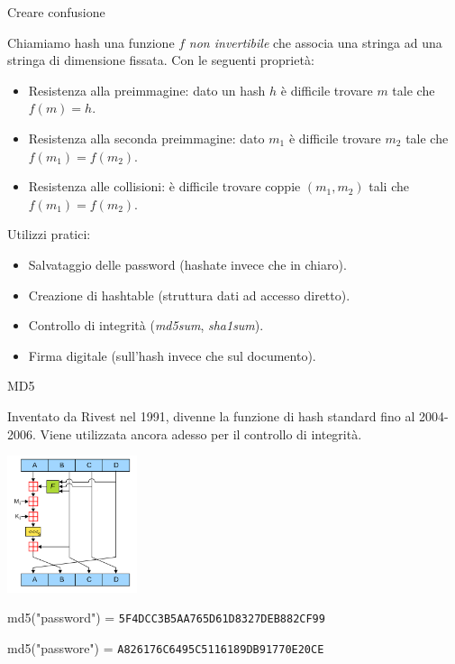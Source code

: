 \documentclass[xcolor=dvipsnames,aspectratio=169]{beamer}
\begin{document}
\begin{frame}{Creare confusione}

\pause

Chiamiamo hash una funzione $f$ \textit{non invertibile} che associa una stringa ad una stringa di dimensione fissata. Con le seguenti proprietà:

\pause

\begin{itemize}
  \item Resistenza alla preimmagine: dato un hash $h$ è difficile trovare $m$ tale che $f(m) = h$.
  \item Resistenza alla seconda preimmagine: dato $m_1$ è difficile trovare $m_2$ tale che $f(m_1) = f(m_2)$.
  \item Resistenza alle collisioni: è difficile trovare coppie $(m_1, m_2)$ tali che $f(m_1) = f(m_2)$.
\end{itemize}

\pause

Utilizzi pratici:

\begin{itemize}
  \item Salvataggio delle password (hashate invece che in chiaro).
  \item Creazione di hashtable (struttura dati ad accesso diretto).
  \item Controllo di integrità (\textit{md5sum}, \textit{sha1sum}).
  \item Firma digitale (sull'hash invece che sul documento).
\end{itemize}

\end{frame}

\begin{frame}{MD5}
  
    \pause
  Inventato da Rivest nel 1991, divenne la funzione di hash standard fino al 2004-2006.
  Viene utilizzata ancora adesso per il controllo di integrità.
    
    \pause
  \medskip
  
  \centering
  {
  \includegraphics[width=3.8cm]{img/md5}
  }
  
    \pause
  md5("password") = \texttt{5F4DCC3B5AA765D61D8327DEB882CF99}
  
    \pause
  md5("passwore") = \texttt{A826176C6495C5116189DB91770E20CE}
  
\end{frame}
\end{document}
